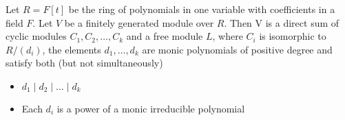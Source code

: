 \documentclass{memoir}
\begin{document}
\begin{thm}
	Let \(R = F[t]\) be the ring of polynomials in one variable with coefficients in a field \(F\). Let \(V\) be a finitely generated module over \(R\). Then V is a direct sum of cyclic modules \(C_1,C_2,\ldots,C_k\) and a free module \(L\), where \(C_i\) is isomorphic to \(R / (d_i)\), the elements \(d_1,\ldots,d_k\) are monic polynomials of positive degree and satisfy both (but not simultaneously)
\begin{itemize}
	\item \(d_1\mid d_2\mid \ldots\mid d_k\) 
	\item Each \(d_i\) is a power of a monic irreducible polynomial
\end{itemize}
\end{thm}

\end{document}
